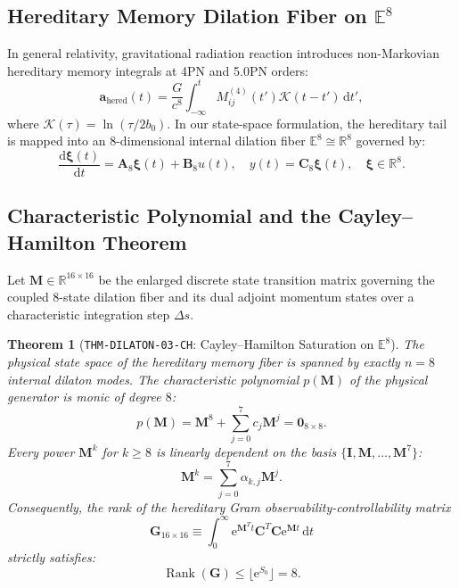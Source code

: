 \documentclass[11pt,a4paper,reqno]{article}
\theoremstyle{plain}
\newtheorem{theorem}{Theorem}[section]
\theoremstyle{definition}
\theoremstyle{remark}
\numberwithin{equation}{section}
\providecommand{\diff}{\mathrm{d}}
\DeclareMathOperator{\Rank}{Rank}
\begin{document}
\subsection{Hereditary Memory Dilation Fiber on \texorpdfstring{$\mathbb{E}^8$}{E\textasciicircum 8}}
\label{subsec:hereditary_fiber_e8}
In general relativity, gravitational radiation reaction introduces non-Markovian hereditary memory integrals at 4PN and 5.0PN orders:
\begin{equation}
  \mathbf{a}_{\mathrm{hered}}(t) = \frac{G}{c^8} \int_{-\infty}^t M_{ij}^{(4)}(t') \mathcal{K}(t - t') \, \diff t',
  \label{eq:hereditary_integral_4pn}
\end{equation}
where $\mathcal{K}(\tau) = \ln(\tau / 2 b_0)$. In our state-space formulation, the hereditary tail is mapped into an 8-dimensional internal dilation fiber $\mathbb{E}^8 \cong \mathbb{R}^8$ governed by:
\begin{equation}
  \frac{\diff \bm{\xi}(t)}{\diff t} = \mathbf{A}_8 \bm{\xi}(t) + \mathbf{B}_8 u(t), \quad y(t) = \mathbf{C}_8 \bm{\xi}(t), \quad \bm{\xi} \in \mathbb{R}^8.
  \label{eq:dilation_fiber_odes}
\end{equation}

\subsection{Characteristic Polynomial and the Cayley--Hamilton Theorem}
\label{subsec:cayley_hamilton_proof}
Let $\mathbf{M} \in \mathbb{R}^{16 \times 16}$ be the enlarged discrete state transition matrix governing the coupled 8-state dilation fiber and its dual adjoint momentum states over a characteristic integration step $\Delta s$.

\begin{theorem}[\texttt{THM-DILATON-03-CH}: Cayley--Hamilton Saturation on $\mathbb{E}^8$]
\label{thm:cayley_hamilton_saturation}
The physical state space of the hereditary memory fiber is spanned by exactly $n = 8$ internal dilaton modes. The characteristic polynomial $p(\mathbf{M})$ of the physical generator is monic of degree $8$:
\begin{equation}
  p(\mathbf{M}) = \mathbf{M}^8 + \sum_{j=0}^7 c_j \mathbf{M}^j = \mathbf{0}_{8 \times 8}.
\end{equation}
Every power $\mathbf{M}^k$ for $k \ge 8$ is linearly dependent on the basis $\{\mathbf{I}, \mathbf{M}, \dots, \mathbf{M}^7\}$:
\begin{equation}
  \mathbf{M}^k = \sum_{j=0}^7 \alpha_{k,j} \mathbf{M}^j.
\end{equation}
Consequently, the rank of the hereditary Gram observability-controllability matrix
\begin{equation}
  \mathbf{G}_{16 \times 16} \equiv \int_0^\infty \mathrm{e}^{\mathbf{M}^T t} \mathbf{C}^T \mathbf{C} \mathrm{e}^{\mathbf{M} t} \, \diff t
\end{equation}
strictly satisfies:
\begin{equation}
  \Rank(\mathbf{G}) \le \lfloor \mathrm{e}^{S_0} \rfloor = 8.
  \label{eq:rank_bound}
\end{equation}
\end{theorem}
\end{document}

